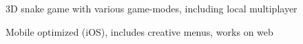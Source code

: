 \documentclass[]{deedy-resume-openfont}
\begin{document}
\begin{minipage}[t]{0.66\textwidth}

\begin{tightemize}
\item 3D snake game with various game-modes, including local multiplayer\\
\item Mobile optimized (iOS), includes creative menus, works on web\\
\end{tightemize}
\sectionsep






\end{minipage}
\end{document}

